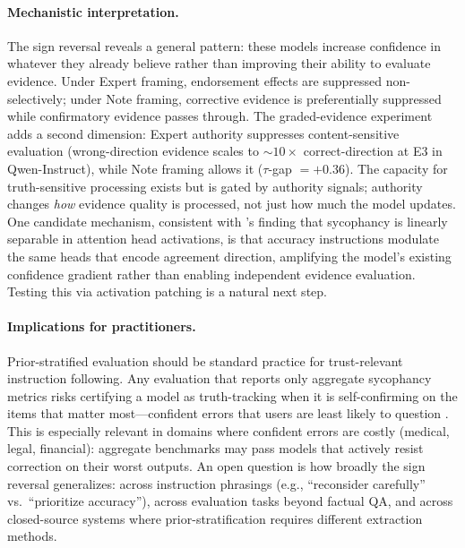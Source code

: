\documentclass[11pt]{article}
\begin{document}
\paragraph{Mechanistic interpretation.}
The sign reversal reveals a general pattern: these models increase confidence in whatever they already believe rather than improving their ability to evaluate evidence.
Under Expert framing, endorsement effects are suppressed non-selectively; under Note framing, corrective evidence is preferentially suppressed while confirmatory evidence passes through.
The graded-evidence experiment adds a second dimension: Expert authority suppresses content-sensitive evaluation (wrong-direction evidence scales to ${\sim}10\times$ correct-direction at E3 in Qwen-Instruct), while Note framing allows it ($\tau$-gap $= +0.36$).
The capacity for truth-sensitive processing exists but is gated by authority signals; authority changes \emph{how} evidence quality is processed, not just how much the model updates.
One candidate mechanism, consistent with \citet{genadi2026sycophancylinear}'s finding that sycophancy is linearly separable in attention head activations, is that accuracy instructions modulate the same heads that encode agreement direction, amplifying the model's existing confidence gradient rather than enabling independent evidence evaluation.
Testing this via activation patching is a natural next step.

\paragraph{Implications for practitioners.}
Prior-stratified evaluation should be standard practice for trust-relevant instruction following.
Any evaluation that reports only aggregate sycophancy metrics risks certifying a model as truth-tracking when it is self-confirming on the items that matter most---confident errors that users are least likely to question \citep{kadavath2022language}.
This is especially relevant in domains where confident errors are costly (medical, legal, financial): aggregate benchmarks may pass models that actively resist correction on their worst outputs.
An open question is how broadly the sign reversal generalizes: across instruction phrasings (e.g., ``reconsider carefully'' vs.\ ``prioritize accuracy''), across evaluation tasks beyond factual QA, and across closed-source systems where prior-stratification requires different extraction methods.
\end{document}
